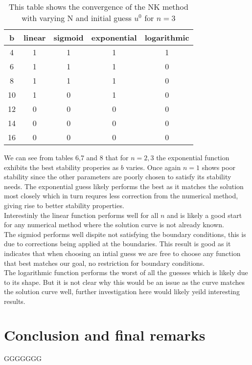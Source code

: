 \documentclass{article}
\begin{document}
\begin{table}[H]
\centering
\begin{tabular}{|c|c|c|c|c|}
\hline
b                                          & linear  & sigmoid & exponential & logarithmic \\
\hline
4                                          & 1 & 1 & 1 & 1\\
6                                          & 1 & 1 & 1 & 0\\
8                                          & 1 & 1 & 1 & 0\\
10                                         & 1 & 0 & 1 & 0\\
12                                         & 0 & 0 & 0 & 0\\
14                                         & 0 & 0 & 0 & 0\\
16                                         & 0 & 0 & 0 & 0\\
\hline
\end{tabular}
\caption{This table shows the convergence of the NK method with varying N and initial guess $u^0$ for $n=3$}
\end{table} 
We can see from tables 6,7 and 8 that for $n=2,3$ the exponential function exhibits the best stability properies as $b$ varies. Once again $n=1$ shows poor stability since the other parameters are poorly chosen to satisfy its stability needs. The exponential guess likely performs the best as it matches the solution most closely which in turn requres less correction from the numerical method, giving rise to better stability properties. \\
Interestinly the linear function performs well for all $n$ and is likely a good start for any numerical method where the solution curve is not already known. \\
The sigmiod performs well dispite not satisfying the boundary conditions, this is due to corrections being applied at the boundaries. This result is good as it indicates that when choosing an intial guess we are free to choose any function that best matches our goal, no restriction for boundary conditions. \\
The logarithmic function performs the worst of all the guesses which is likely due to its shape. But it is not clear why this would be an issue as the curve matches the solution curve well, further investigation here would likely yeild interesting results. \\
\section{Conclusion and final remarks}
GGGGGGG
\end{document}
